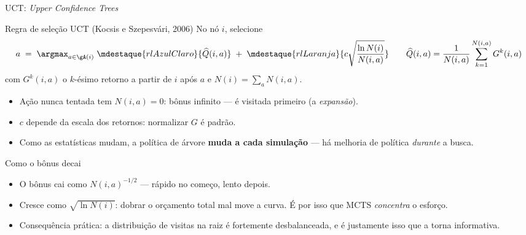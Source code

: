 \documentclass[aspectratio=169, 11pt]{beamer}
\newcommand{\Nv}[1]{N(#1)}                      %
\newcommand{\Qh}{\widehat{Q}}                   %
\newcommand{\ret}{G}                            %
\begin{document}
\begin{frame}{UCT: \emph{Upper Confidence Trees}}
  \begin{teobox}{Regra de seleção UCT (Kocsis e Szepesvári, 2006)}
    No nó $i$, selecione
    \[
      a \;=\; \argmax_{a\in\gA(i)}\;
      \mdestaque{rlAzulClaro}{\Qh(i,a)}
      \;+\;
      \mdestaque{rlLaranja}{c\sqrt{\frac{\ln \Nv{i}}{\Nv{i,a}}}}
      \qquad
      \Qh(i,a) = \frac{1}{\Nv{i,a}}\sum_{k=1}^{\Nv{i,a}} \ret^k(i,a)
    \]
    com $\ret^k(i,a)$ o $k$-ésimo retorno a partir de $i$ após $a$ e
    $\Nv{i}=\sum_a \Nv{i,a}$.
  \end{teobox}

  \pause
  \begin{itemize}\setlength{\itemsep}{0.3ex}
    \item Ação nunca tentada tem $\Nv{i,a}=0$: bônus infinito --- é visitada
          primeiro (a \emph{expansão}).
    \item $c$ depende da escala dos retornos: normalizar $\ret$ é padrão.
    \item Como as estatísticas mudam, a política de árvore \textbf{muda a cada
          simulação} --- há melhoria de política \emph{durante} a busca.
  \end{itemize}
\end{frame}

\begin{frame}{Como o bônus decai}
  \centering

  \vfill
  \raggedright
  \begin{itemize}
    \item O bônus cai como $\Nv{i,a}^{-1/2}$ --- rápido no começo, lento depois.
    \item Cresce como $\sqrt{\ln \Nv{i}}$: dobrar o orçamento total mal move a
          curva. É por isso que MCTS \emph{concentra} o esforço.
    \item Consequência prática: a distribuição de visitas na raiz é fortemente
          desbalanceada, e é justamente isso que a torna informativa.
  \end{itemize}
\end{frame}
\end{document}
